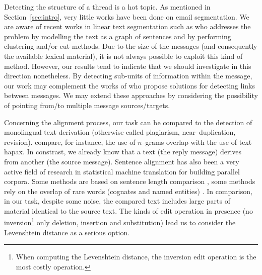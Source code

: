 Detecting the structure of a thread is a hot topic. 
%
As mentioned in Section~\ref{sec:intro}, very little works have been done on email segmentation. 
We are aware of recent works in linear text segmentation such as \cite{kazantseva:2011} who addresses the problem by modelling the text as a graph of sentences and by performing clustering and/or cut methods. 
%
Due to the size of the messages (and consequently the available lexical material), it is not always possible to exploit this kind of method. However, our results tend to indicate that we should investigate in this direction nonetheless.
%
By detecting sub-units of information within the message, our work may complement the works of \cite{li:2011:threadlinking,kim:2010:taggingandlinking} who propose solutions for detecting links between messages. 
We may extend these approaches by considering the possibility of pointing from/to multiple message sources/targets. %

Concerning the alignment process, our task can be compared to the detection of monolingual text derivation (otherwise called plagiarism, near–duplication, revision). \cite{poulard:2011:detecting} compare, for instance, the use of $n$–grams overlap with the use of text hapax. 
In constrast, we already know that a text (the reply message) derives from another (the source message). Sentence alignment has also been a very active field of research 
in statistical machine translation for building parallel corpora. %
%
Some methods are based on sentence length comparison \cite{gale:1991}, some methods rely on the overlap of rare words (cognates and named entities) \cite{enright-kondrak:2007:ShortPapers}.
In comparison, %
in our task, despite some noise, the compared text includes large parts of material identical to the source text. 
The kinds of edit operation in presence (no inversion\footnote{When computing the Levenshtein distance, the inversion edit operation is the most costly operation.} only deletion, insertion and substitution) lead us to consider the Levenshtein distance as a serious option.  

